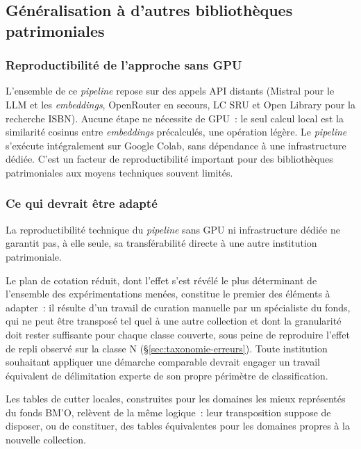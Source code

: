 \subsection{Généralisation à d'autres bibliothèques patrimoniales}

\subsubsection*{Reproductibilité de l'approche sans GPU}
\label{sec:reproductibilite-gpu}

L'ensemble de ce \textit{pipeline} repose sur des appels API distants (Mistral pour le LLM et les \textit{embeddings}, OpenRouter en secours, LC SRU et Open Library pour la recherche ISBN). Aucune étape ne nécessite de GPU~: le seul calcul local est la similarité cosinus entre \textit{embeddings} précalculés, une opération légère. Le \textit{pipeline} s'exécute intégralement sur Google Colab, sans dépendance à une infrastructure dédiée. C’est un facteur de reproductibilité important pour des bibliothèques patrimoniales aux moyens techniques souvent limités.





\subsubsection*{Ce qui devrait être adapté}

La reproductibilité technique du \textit{pipeline} sans GPU ni infrastructure dédiée ne garantit pas, à elle seule, sa transférabilité directe à une autre institution patrimoniale.

Le plan de cotation réduit, dont l'effet s'est révélé le plus déterminant de l'ensemble des expérimentations menées, constitue le premier des éléments à adapter~: il résulte d'un travail de curation manuelle par un spécialiste du fonds, qui ne peut être transposé tel quel à une autre collection et dont la granularité doit rester suffisante pour chaque classe couverte, sous peine de reproduire l'effet de repli observé sur la classe N (\S\ref{sec:taxonomie-erreurs}). Toute institution souhaitant appliquer une démarche comparable devrait engager un travail équivalent de délimitation experte de son propre périmètre de classification.

Les tables de cutter locales, construites pour les domaines les mieux représentés du fonds BM'O, relèvent de la même logique~: leur transposition suppose de disposer, ou de constituer, des tables équivalentes pour les domaines propres à la nouvelle collection.

